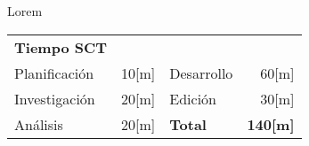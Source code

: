 \documentclass[fleqn,10pt]{SelfArx}
\begin{document}
\flushbottom %
\maketitle %
\thispagestyle{empty} %


Lorem \cite{estr} \lipsum[1-4]




\GenerateBottom%
%
\begin{tabularx}{\textwidth}{l r l r}
    \textbf{Tiempo SCT} & & & \\
    Planificación &  10[m] & Desarrollo & 60[m] \\
    Investigación & 20[m] & Edición & 30[m] \\
    Análisis & 20[m] & \textbf{Total} & \textbf{140[m]} \\
\end{tabularx}

\end{document}
